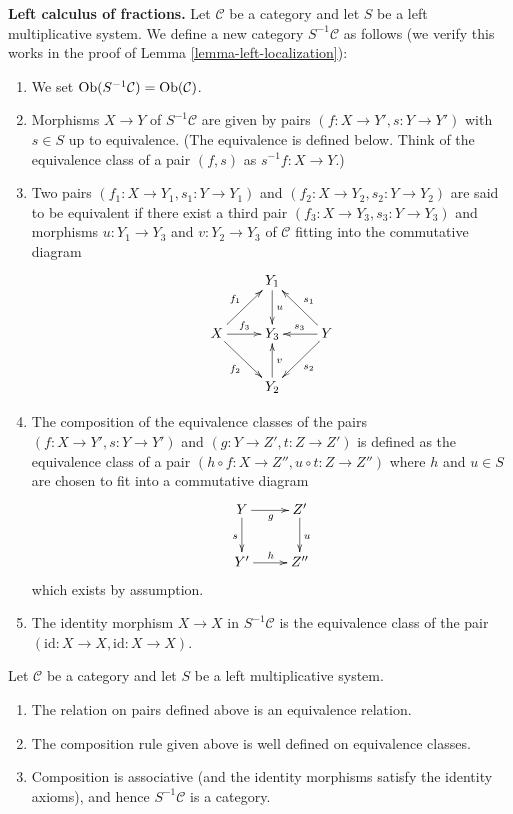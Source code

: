 \medskip\noindent
{\bf Left calculus of fractions.}
Let $\mathcal{C}$ be a category and let $S$ be a left multiplicative
system. We define a new category $S^{-1}\mathcal{C}$ as follows
(we verify this works in the proof of
Lemma \ref{lemma-left-localization}):
\begin{enumerate}
\item We set $\mathop{\mathrm{Ob}}\nolimits(S^{-1}\mathcal{C}) = \mathop{\mathrm{Ob}}\nolimits(\mathcal{C})$.
\item Morphisms $X \to Y$ of $S^{-1}\mathcal{C}$ are given by pairs
$(f : X \to Y', s : Y \to Y')$ with $s \in S$ up to equivalence.
(The equivalence is defined below. Think of the equivalence class
of a pair $(f, s)$ as $s^{-1}f : X \to Y$.)
\item Two pairs $(f_1 : X \to Y_1, s_1 : Y \to Y_1)$ and
$(f_2 : X \to Y_2, s_2 : Y \to Y_2)$ are said to be equivalent
if there exist a third pair $(f_3 : X \to Y_3, s_3 : Y \to Y_3)$
and morphisms $u : Y_1 \to Y_3$ and $v : Y_2 \to Y_3$ of $\mathcal{C}$
fitting into the commutative diagram
$$
\xymatrix{
 & Y_1 \ar[d]^u & \\
X \ar[ru]^{f_1} \ar[r]^{f_3} \ar[rd]_{f_2} &
Y_3 &
Y \ar[lu]_{s_1} \ar[l]_{s_3} \ar[ld]^{s_2} \\
& Y_2 \ar[u]_v &
}
$$
\item The composition of the equivalence classes of the pairs
$(f : X \to Y', s : Y \to Y')$ and $(g : Y \to Z', t : Z \to Z')$
is defined as the equivalence class of a pair
$(h \circ f : X \to Z'', u \circ t : Z \to Z'')$
where $h$ and $u \in S$ are chosen to fit into a commutative diagram
$$
\xymatrix{
Y \ar[d]_s \ar[r]_g & Z' \ar[d]^u \\
Y' \ar[r]^h & Z''
}
$$
which exists by assumption.
\item The identity morphism $X \to X$ in $S^{-1} \mathcal{C}$ is the
equivalence class of the pair $(\text{id} : X \to X,
\text{id} : X \to X)$.
\end{enumerate}

\begin{lemma}
\label{lemma-left-localization}
Let $\mathcal{C}$ be a category and let $S$ be a left multiplicative
system.
\begin{enumerate}
\item The relation on pairs defined above is an equivalence relation.
\item The composition rule given above is well defined on equivalence
classes.
\item Composition is associative (and the identity morphisms satisfy
the identity axioms), and hence $S^{-1}\mathcal{C}$ is a category.
\end{enumerate}
\end{lemma}

